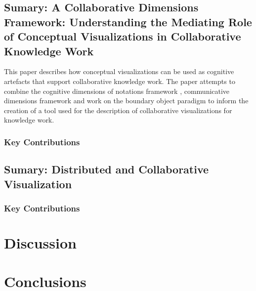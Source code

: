 \documentclass{sig-alternate}
\begin{document}
\subsection{Sumary: A Collaborative Dimensions Framework: Understanding the Mediating Role of Conceptual Visualizations in Collaborative Knowledge Work}
This paper describes how conceptual visualizations can be used as cognitive
artefacts that support collaborative knowledge work. The paper attempts to
combine the cognitive dimensions of notations framework \cite{Blackwell:NotationalSystems} ,
communicative dimensions framework 
\cite{Hundhausen:CommunicativeDimensionsFramework} and work on the boundary
object paradigm \cite{Star:BoundaryObjects} to inform the creation of a tool
used for the description of collaborative visualizations for knowledge work.
\subsubsection{Key Contributions}
\subsection{Sumary: Distributed and Collaborative Visualization}
\subsubsection{Key Contributions}
\section{Discussion}
\section{Conclusions}

\end{document}
